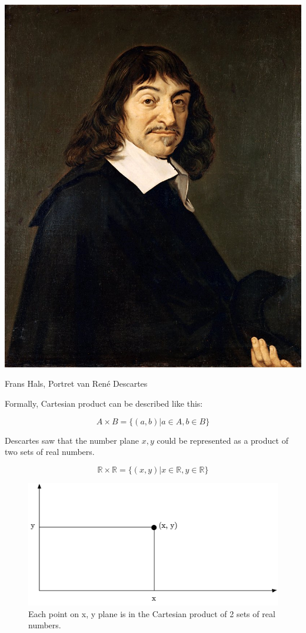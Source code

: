 \documentclass[a4paper, justified, notitlepage, sfsidenotes, notoc]{tufte-book}
\begin{document}
\begin{marginfigure}
  \includegraphics[width=\linewidth]{images/Frans_Hals_-_Portret_van_Rene_Descartes.jpg}
  \caption{Frans Hals, Portret van René Descartes}
  \label{fig:marginfig}
\end{marginfigure}

Formally, Cartesian product can be described like this:

\begin{equation}
A \times B = \{(a,b) | a \in A, b \in B\}
\end{equation}

Descartes saw that the number plane \(x, y\) could be represented as a product of two sets of real numbers.

\begin{equation}
\mathbb{R} \times \mathbb{R} = \{(x, y) | x \in \mathbb{R}, y \in \mathbb{R}\}
\end{equation}

\begin{figure}[htbp]
\centering
\includegraphics[width=.9\linewidth]{./images/xy_plane.png}
\caption{\label{fig:orge2eb83a}
Each point on x, y plane is in the Cartesian product of 2 sets of real numbers.}
\end{figure}
\end{document}
